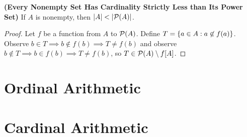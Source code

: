 \documentclass{report}
\begin{document}
\begin{theorem}
\label{0.4.19}
\textbf{(Every Nonempty Set Has Cardinality Strictly Less than Its Power Set)} If $A$ is nonempty, then  $\abso{A}<\abso{\power{A}}$.
\end{theorem}
\begin{proof}
  Let $f$ be a function from $A$ to  $\mathcal{P}(A)$. Define $T=\{ a\in A:a\not\in f(a) \}$. Observe $b \in T\implies b\not\in f(b)\implies T\neq f(b)$ and observe $b\not\in T\implies b\in f(b)\implies T\neq f(b)$, so $T\in \mathcal{P}(A)\setminus f[A]$.  
\end{proof}
\section{Ordinal Arithmetic}
\section{Cardinal Arithmetic}
\end{document}
